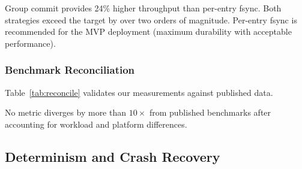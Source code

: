 Group commit provides 24\% higher throughput than per-entry fsync. Both
strategies exceed the target by over two orders of magnitude. Per-entry fsync
is recommended for the MVP deployment (maximum durability with acceptable
performance).

\subsubsection{Benchmark Reconciliation}

Table~\ref{tab:reconcile} validates our measurements against published data.

\begin{table}[ht]
\centering
\caption{Benchmark Reconciliation with Published Data}
\label{tab:reconcile}
\end{table}

No metric diverges by more than $10\times$ from published benchmarks after
accounting for workload and platform differences.

\subsection{Determinism and Crash Recovery}

